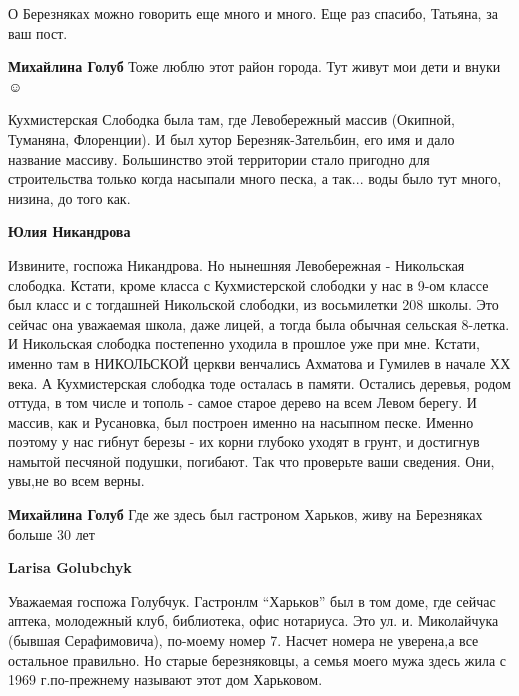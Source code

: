 \begin{itemize}
О Березняках можно говорить еще много и много. Еще раз спасибо, Татьяна, за ваш
пост.

\begin{itemize} %
\textbf{Михайлина Голуб} Тоже люблю этот район города. Тут живут мои дети и внуки ☺ ️ 


Кухмистерская Слободка была там, где Левобережный массив (Окипной, Туманяна,
Флоренции). И был хутор Березняк-Зательбин, его имя и дало название массиву.
Большинство этой территории стало пригодно для строительства только когда
насыпали много песка, а так... воды было тут много, низина, до того как.

\begin{itemize} %
\textbf{Юлия Никандрова} 

Извините, госпожа Никандрова. Но нынешняя Левобережная - Никольская слободка.
Кстати, кроме класса с Кухмистерской слободки у нас в 9-ом классе был класс и с
тогдашней Никольской слободки, из восьмилетки 208 школы. Это сейчас она
уважаемая школа, даже лицей, а тогда была обычная сельская 8-летка. И
Никольская слободка постепенно уходила в прошлое уже при мне. Кстати, именно
там в НИКОЛЬСКОЙ церкви венчались Ахматова и Гумилев в начале ХХ века. А
Кухмистерская слободка тоде осталась в памяти. Остались деревья, родом оттуда,
в том числе и тополь - самое старое дерево на всем Левом берегу. И массив, как
и Русановка, был построен именно на насыпном песке. Именно поэтому у нас гибнут
березы - их корни глубоко уходят в грунт, и достигнув намытой песчяной
подушки, погибают. Так что проверьте ваши сведения. Они, увы,не во всем верны.

\end{itemize} %

\textbf{Михайлина Голуб} Где же здесь был гастроном Харьков, живу на Березняках больше 30 лет

\begin{itemize} %
\textbf{Larisa Golubchyk} 

Уважаемая госпожа Голубчук. Гастронлм \enquote{Харьков} был в том доме, где сейчас
аптека, молодежный клуб, библиотека, офис нотариуса. Это ул. и. Миколайчука
(бывшая Серафимовича), по-моему номер 7. Насчет номера не уверена,а все
остальное правильно. Но старые березняковцы, а семья моего мужа здесь жила с
1969 г.по-прежнему называют этот дом Харьковом.

\end{itemize} %


\end{itemize}
\end{itemize}
